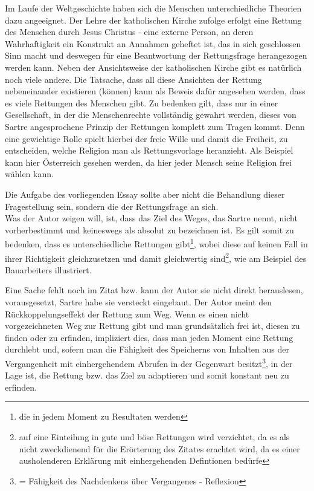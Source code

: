 \documentclass[12pt,a4paper,oneside]{article}
\begin{document}
  Im Laufe der Weltgeschichte haben sich die Menschen unterschiedliche Theorien dazu angeeignet. Der Lehre der katholischen Kirche zufolge erfolgt eine Rettung des Menschen durch Jesus Christus - eine externe Person, an deren Wahrhaftigkeit ein Konstrukt an Annahmen geheftet ist, das in sich geschlossen Sinn macht und deswegen für eine Beantwortung der Rettungsfrage herangezogen werden kann. Neben der Ansichtsweise der katholischen Kirche gibt es natürlich noch viele andere. Die Tatsache, dass all diese Ansichten der Rettung nebeneinander existieren (können) kann als Beweis dafür angesehen werden, dass es viele Rettungen des Menschen gibt. Zu bedenken gilt, dass nur in einer Gesellschaft, in der die Menschenrechte vollständig gewahrt werden, dieses von Sartre angesprochene Prinzip der Rettungen komplett zum Tragen kommt. Denn eine gewichtige Rolle spielt hierbei der freie Wille und damit die Freiheit, zu entscheiden, welche Religion man als Rettungsvorlage heranzieht. Als Beispiel kann hier Österreich gesehen werden, da hier jeder Mensch seine Religion frei wählen kann. 
  
  Die Aufgabe des vorliegenden Essay sollte aber nicht die Behandlung dieser Fragestellung sein, sondern die der Rettungsfrage an sich.\\
  
  Was der Autor zeigen will, ist, dass das Ziel des Weges, das Sartre nennt, nicht vorherbestimmt und keineswegs als absolut zu bezeichnen ist. Es gilt somit zu bedenken, dass es unterschiedliche Rettungen gibt\footnote{die in jedem Moment zu Resultaten werden}, wobei diese auf keinen Fall in ihrer Richtigkeit gleichzusetzen und damit gleichwertig sind\footnote{auf eine Einteilung in gute und böse Rettungen wird verzichtet, da es als nicht zweckdienend für die Erörterung des Zitates erachtet wird, da es einer ausholenderen Erklärung mit einhergehenden Defintionen bedürfe}, wie am Beispiel des Bauarbeiters illustriert. 
  
  Eine Sache fehlt noch im Zitat bzw. kann der Autor sie nicht direkt herauslesen, vorausgesetzt, Sartre habe sie versteckt eingebaut. Der Autor meint den Rückkoppelungseffekt der Rettung zum Weg. Wenn es einen nicht vorgezeichneten Weg zur Rettung gibt und man grundsätzlich frei ist, diesen zu finden oder zu erfinden, impliziert dies, dass man jeden Moment eine Rettung durchlebt und, sofern man die Fähigkeit des Speicherns von Inhalten aus der Vergangenheit mit einhergehendem Abrufen in der Gegenwart besitzt\footnote{= Fähigkeit des Nachdenkens über Vergangenes - Reflexion}, in der Lage ist, die Rettung bzw. das Ziel zu adaptieren und somit konstant neu zu erfinden. \\
  
\end{document}
